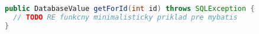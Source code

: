 
\begin{lstlisting}[language=Java, caption={Example of object loading from database using MyBatis}, label={code:mybatis:annotation}]
public DatabaseValue getForId(int id) throws SQLException {
  // TODO RE funkcny minimalisticky priklad pre mybatis
}
\end{lstlisting}
